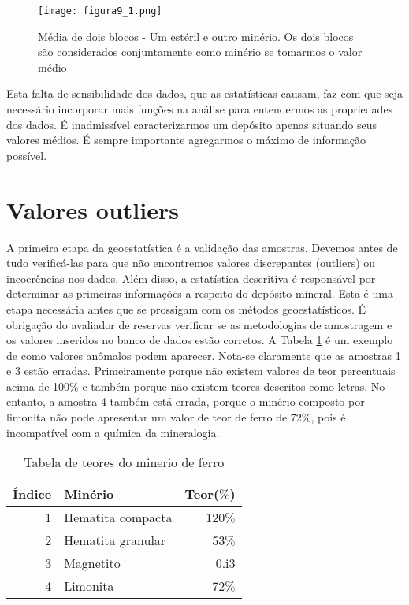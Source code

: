 \begin{figure}[H]
\centering
\texttt{[image: figura9\_1.png]}	
\caption{Média de dois blocos - Um estéril e outro 
	minério. Os dois blocos são considerados conjuntamente como minério se tomarmos o valor médio }
\label{Fig9_1}
\end{figure}

Esta falta de sensibilidade dos dados, que as estatísticas causam, faz com que seja necessário incorporar mais funções na análise para entendermos as propriedades dos dados. É inadmissível caracterizarmos um depósito apenas situando seus valores médios. É sempre importante agregarmos o máximo de informação possível. 

\section{Valores outliers}

A primeira etapa da geoestatística é a validação das amostras. Devemos antes de tudo verificá-las para que não encontremos valores discrepantes (outliers) ou incoerências nos dados. Além disso, a estatística descritiva é responsável por determinar as primeiras informações a respeito do depósito mineral. Esta é uma etapa necessária antes que se prossigam com os métodos geoestatísticos. É obrigação do avaliador de reservas verificar se as metodologias de amostragem e os valores inseridos no banco de dados estão corretos. A Tabela \ref{Tabela1:Minerio_de_ferro} é um exemplo de como valores anômalos podem aparecer. Nota-se claramente que as amostras 1 e 3 estão erradas. Primeiramente porque não existem valores de teor percentuais acima de 100$\%$ e também porque não existem teores descritos como letras. No entanto, a amostra 4 também está errada, porque o minério composto por limonita não pode apresentar um valor de teor de ferro de 72$\%$, pois é incompatível com a  química da mineralogia. 


\begin{table}[H]
\centering
\caption{Tabela de teores do minerio de ferro}
\vspace{0.5cm}
\label{Tabela1:Minerio_de_ferro}
\begin{tabular}{r|lr}
	
	Índice & Minério & Teor($\%$) \\ 
	\hline                               
	1 & Hematita compacta       & 120$\%$ \\
	2 & Hematita granular       & 53$\%$ \\
	3 & Magnetito               & 0.i3 \\
	4 & Limonita                & 72$\%$ \\

\end{tabular}
\end{table}

